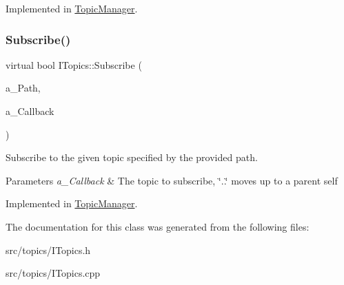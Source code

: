 Implemented in \hyperlink{class_topic_manager_a681e4ef90d13d2f0cca948135f4c8097}{Topic\+Manager}.

\mbox{\label{class_i_topics_a6381bbfcfc39b3630a802bae4c7c5337}} 
\subsubsection{\texorpdfstring{Subscribe()}{Subscribe()}}
{\footnotesize\ttfamily virtual bool I\+Topics\+::\+Subscribe (\begin{DoxyParamCaption}\item[{const std\+::string \&}]{a\+\_\+\+Path,  }\item[{Payload\+Callback}]{a\+\_\+\+Callback }\end{DoxyParamCaption})\hspace{0.3cm}{\ttfamily [pure virtual]}}



Subscribe to the given topic specified by the provided path. 


\begin{DoxyParams}{Parameters}
{\em a\+\_\+\+Callback} & The topic to subscribe, \char`\"{}..\char`\"{} moves up to a parent self \\
\hline
\end{DoxyParams}


Implemented in \hyperlink{class_topic_manager_a45df0bdd5a5d9ba4dfbb471726cf04c5}{Topic\+Manager}.



The documentation for this class was generated from the following files\+:\begin{DoxyCompactItemize}
\item 
src/topics/I\+Topics.\+h\item 
src/topics/I\+Topics.\+cpp\end{DoxyCompactItemize}
